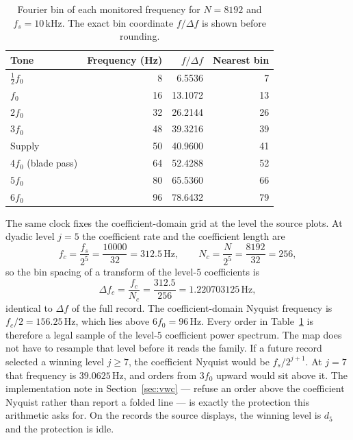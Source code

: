 \begin{table}[H]
\centering
\caption{Fourier bin of each monitored frequency for \(N=8192\) and \(f_{s}=10\,\mathrm{kHz}\). The exact bin coordinate \(f/\Delta f\) is shown before rounding.}
\label{tab:bins}
\begin{tabular}{lrrr}
\toprule
Tone & Frequency (Hz) & \(f/\Delta f\) & Nearest bin \\
\midrule
\(\tfrac12 f_{0}\) & 8 & 6.5536 & 7 \\
\(f_{0}\) & 16 & 13.1072 & 13 \\
\(2f_{0}\) & 32 & 26.2144 & 26 \\
\(3f_{0}\) & 48 & 39.3216 & 39 \\
Supply & 50 & 40.9600 & 41 \\
\(4f_{0}\) (blade pass) & 64 & 52.4288 & 52 \\
\(5f_{0}\) & 80 & 65.5360 & 66 \\
\(6f_{0}\) & 96 & 78.6432 & 79 \\
\bottomrule
\end{tabular}
\end{table}

The same clock fixes the coefficient-domain grid at the level the source plots.
At dyadic level \(j=5\) the coefficient rate and the coefficient length are
\begin{equation}
f_{c}=\frac{f_{s}}{2^{5}}=\frac{10000}{32}=312.5\,\mathrm{Hz},
\qquad
N_{c}=\frac{N}{2^{5}}=\frac{8192}{32}=256,
\label{eq:coeffgrid}
\end{equation}
so the bin spacing of a transform of the level-\(5\) coefficients is
\begin{equation}
\Delta f_{c}=\frac{f_{c}}{N_{c}}=\frac{312.5}{256}=1.220703125\,\mathrm{Hz},
\label{eq:dfc}
\end{equation}
identical to \(\Delta f\) of the full record.
The coefficient-domain Nyquist frequency is \(f_{c}/2=156.25\,\mathrm{Hz}\), which lies above \(6f_{0}=96\,\mathrm{Hz}\).
Every order in Table~\ref{tab:bins} is therefore a legal sample of the level-\(5\) coefficient power spectrum.
The map does not have to resample that level before it reads the family.
If a future record selected a winning level \(j\ge 7\), the coefficient Nyquist would be \(f_{s}/2^{j+1}\).
At \(j=7\) that frequency is \(39.0625\,\mathrm{Hz}\), and orders from \(3f_{0}\) upward would sit above it.
The implementation note in Section~\ref{sec:vwc} --- refuse an order above the coefficient Nyquist rather than report a folded line --- is exactly the protection this arithmetic asks for.
On the records the source displays, the winning level is \(d_{5}\) and the protection is idle.

